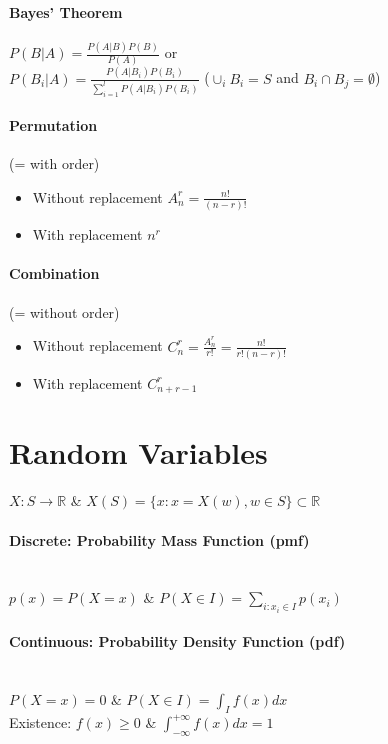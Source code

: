 \documentclass[paper=a4,fontsize=8pt,pagesize,DIV=calc]{scrartcl}
\newcounter{row}
\begin{document}
\begin{multicols}{3}
\paragraph{Bayes' Theorem} $P(B|A)=\frac{P(A|B)P(B)}{P(A)}$ or \\$P(B_i|A)=\frac{P(A|B_i)P(B_i)}{\sum^l_{i=1}P(A|B_i)P(B_i)}$ ($\cup_iB_i=S$ and $B_i\cap B_j=\emptyset$)
\paragraph{Permutation} (= with order)
\begin{itemize}
\item Without replacement $A^r_n=\frac{n!}{(n-r)!}$
\item With replacement $n^r$
\end{itemize}
\paragraph{Combination} (= without order)
\begin{itemize}
\item Without replacement $C^r_n=\frac{A^r_n}{r!}=\frac{n!}{r!(n-r)!}$
\item With replacement $C^r_{n+r-1}$
\end{itemize}

\section{Random Variables}
$X: S \rightarrow \mathbb{R}$ \& $X(S)=\{x:x=X(w), w\in S\}\subset\mathbb{R}$

\paragraph{Discrete: Probability Mass Function (pmf)} ~~\\ $p(x)=P(X=x)$ \& $P(X\in I)=\sum_{i:x_i\in I} p(x_i)$
\paragraph{Continuous: Probability Density Function (pdf)}~~\\  $P(X=x)=0$ \& $P(X\in I)=\int_I f(x)dx$\\
Existence: $f(x)\geq0$ \& $\int^{+\infty}_{-\infty} f(x)dx=1$

\end{multicols}
\end{document}
